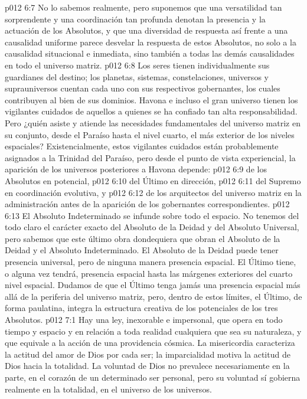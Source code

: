 \vs p012 6:7 No lo sabemos realmente, pero suponemos que una versatilidad tan sorprendente y una coordinación tan profunda denotan la presencia y la actuación de los Absolutos, y que una diversidad de respuesta así frente a una causalidad uniforme parece desvelar la respuesta de estos Absolutos, no solo a la causalidad situacional e inmediata, sino también a todas las demás causalidades en todo el universo matriz.
\vs p012 6:8 \pc Los seres tienen individualmente sus guardianes del destino; los planetas, sistemas, constelaciones, universos y suprauniversos cuentan cada uno con sus respectivos gobernantes, los cuales contribuyen al bien de sus dominios. Havona e incluso el gran universo tienen los vigilantes cuidados de aquellos a quienes se ha confiado tan alta responsabilidad. Pero ¿quién asiste y atiende las necesidades fundamentales del universo matriz en su conjunto, desde el Paraíso hasta el nivel cuarto, el más exterior de los niveles espaciales? Existencialmente, estos vigilantes cuidados están probablemente asignados a la Trinidad del Paraíso, pero desde el punto de vista experiencial, la aparición de los universos posteriores a Havona depende:
\vs p012 6:9 de los Absolutos en potencial,
\vs p012 6:10 del Último en dirección,
\vs p012 6:11 del Supremo en coordinación evolutiva, y
\vs p012 6:12 de los arquitectos del universo matriz en la administración antes de la aparición de los gobernantes correspondientes.
\vs p012 6:13 \pc El Absoluto Indeterminado se infunde sobre todo el espacio. No tenemos del todo claro el carácter exacto del Absoluto de la Deidad y del Absoluto Universal, pero sabemos que este último obra dondequiera que obran el Absoluto de la Deidad y el Absoluto Indeterminado. El Absoluto de la Deidad puede tener presencia universal, pero de ninguna manera presencia espacial. El Último tiene, o alguna vez tendrá, presencia espacial hasta las márgenes exteriores del cuarto nivel espacial. Dudamos de que el Último tenga jamás una presencia espacial más allá de la periferia del universo matriz, pero, dentro de estos límites, el Último, de forma paulatina, integra la estructura creativa de los potenciales de los tres Absolutos.
\vs p012 7:1 Hay una ley, inexorable e impersonal, que opera en todo tiempo y espacio y en relación a toda realidad cualquiera que sea su naturaleza, y que equivale a la acción de una providencia cósmica. La misericordia caracteriza la actitud del amor de Dios por cada ser; la imparcialidad motiva la actitud de Dios hacia la totalidad. La voluntad de Dios no prevalece necesariamente en la parte, en el corazón de un determinado ser personal, pero su voluntad sí gobierna realmente en la totalidad, en el universo de los universos.
